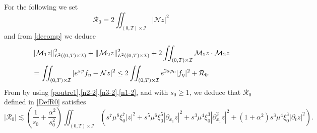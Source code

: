 \documentclass[a4paper, 12pt]{article}
\theoremstyle{plain}
\theoremstyle{definition}
\numberwithin{theorem}{section}
\numberwithin{equation}{section}
\begin{document}
{For the following we set
\begin{equation}\label{DefR0}
\mathcal{R}_0=2\iint_{(0,T)\times\mathcal{I}}|\mathcal{N}z|^2
\end{equation}
and from \eqref{decomp} we deduce
\begin{align}\label{ineqalite1}\notag
&\|\mathcal{M}_1z\|^2_{L^2((0,T)\times\mathcal{I})}+\|\mathcal{M}_2z\|^2_{L^2((0,T)\times\mathcal{I})}+2\iint_{(0,T)\times\mathcal{I}} \mathcal{M}_1z\cdot \mathcal{M}_2z\\&=\iint_{(0,T)\times\mathcal{I}}|e^{s\varphi}f_\eta-\mathcal{N}z|^2
\leq 2\iint_{(0,T)\times\mathcal{I}}e^{2s\varphi_0}|f_\eta|^2+\mathcal{R}_0.
\end{align}
From by using  \eqref{poutre1},\eqref{n2-2},\eqref{n3-2},\eqref{n1-2}, and with $s_0\geq 1$, we deduce that $\mathcal{R}_0$ defined in \eqref{DefR0} satisfies
\begin{equation}\label{EstR0}
\left|\mathcal{R}_0\right|\lesssim \left(\frac{1}{s_0}+\frac{\alpha^2}{s_0^2}\right)\iint_{(0,T)\times\mathcal{I}}\left(s^7\mu^8\xi^7_0|z|^2+s^5\mu^6\xi_0^5|\partial_{x_1}z|^2+s^3\mu^4\xi_0^3|\partial^2_{x_1}z|^2+(1+\alpha^2)s^3\mu^4\xi_0^3|\partial_tz|^2\right).
\end{equation}

}
\end{document}
